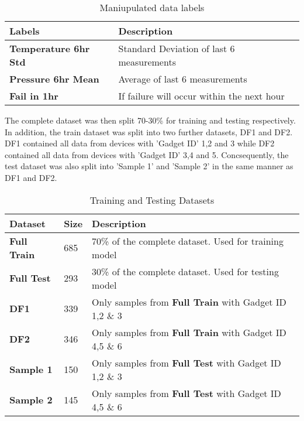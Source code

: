 \begin{table}[H]
    \begin{center}
        \caption{Maniupulated data labels}
        \label{table:labels} 
        \begin{tabular}{ll}
            \toprule
            \textbf{Labels} & \textbf{Description} \\ [0.5ex]
            \midrule
            \textbf{Temperature 6hr Std} & Standard Deviation of last 6 measurements \\
            \textbf{Pressure 6hr Mean} & Average of last 6 measurements \\
            \textbf{Fail in 1hr} & If failure will occur within the next hour \\
            \bottomrule
        \end{tabular}
    \end{center}
\end{table}

The complete dataset was then split 70-30\% for training and testing respectively. 
In addition, the train dataset was split into two further datasets, DF1 and DF2. 
DF1 contained all data from devices with 'Gadget ID' 1,2 and 3 while DF2 contained all data from devices with 'Gadget ID' 3,4 and 5.
Concsequently, the test dataset was also split into 'Sample 1' and 'Sample 2' in the same manner as DF1 and DF2.

\begin{table}[H]
    \begin{center}
        \caption{Training and Testing Datasets}
        \label{table:datasets} 
        \begin{tabular}{lll}
            \toprule
            \textbf{Dataset} & \textbf{Size} &\textbf{Description} \\ [0.5ex]
            \midrule
            \textbf{Full Train} &685& 70\% of the complete dataset. Used for training model \\
            \textbf{Full Test}  &293& 30\% of the complete dataset. Used for testing model \\
            \textbf{DF1}        &339& Only samples from \textbf{Full Train} with Gadget ID 1,2 \& 3 \\
            \textbf{DF2}        &346& Only samples from \textbf{Full Train} with Gadget ID 4,5 \& 6 \\
            \textbf{Sample 1}   &150& Only samples from \textbf{Full Test} with Gadget ID 1,2 \& 3 \\
            \textbf{Sample 2}   &145& Only samples from \textbf{Full Test} with Gadget ID 4,5 \& 6 \\
            \bottomrule
        \end{tabular}
    \end{center}
\end{table}


